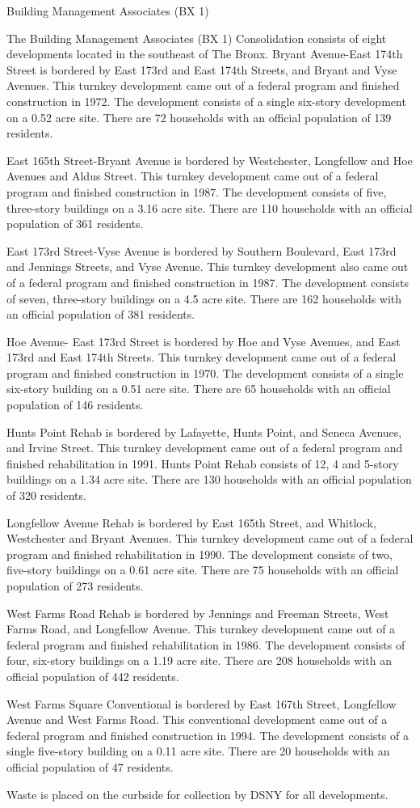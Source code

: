 Building Management Associates (BX 1)

The Building Management Associates (BX 1) Consolidation consists of eight developments located in the southeast of The Bronx. Bryant Avenue-East 174th Street is bordered by East 173rd and East 174th Streets, and Bryant and Vyse Avenues. This turnkey development came out of a federal program and finished construction in 1972. The development consists of a single six-story development on a 0.52 acre site. There are 72 households with an official population of 139 residents.

East 165th Street-Bryant Avenue is bordered by Westchester, Longfellow and Hoe Avenues and Aldus Street. This turnkey development came out of a federal program and finished construction in 1987. The development consists of five, three-story buildings on a 3.16 acre site. There are 110 households with an official population of 361 residents. 

East 173rd Street-Vyse Avenue is bordered by Southern Boulevard, East 173rd and Jennings Streets, and Vyse Avenue. This turnkey development also came out of a federal program and finished construction in 1987. The development consists of seven, three-story buildings on a 4.5 acre site. There are 162 households with an official population of 381 residents.

Hoe Avenue- East 173rd Street is bordered by Hoe and Vyse Avenues, and East 173rd and East 174th Streets. This turnkey development came out of a federal program and finished construction in 1970. The development consists of a single six-story building on a 0.51 acre site. There are 65 households with an official population of 146 residents.

Hunts Point Rehab is bordered by Lafayette, Hunts Point, and Seneca Avenues, and Irvine Street. This turnkey development came out of a federal program and finished rehabilitation in 1991. Hunts Point Rehab consists of 12, 4 and 5-story buildings on a 1.34 acre site. There are 130 households with an official population of 320 residents. 

Longfellow Avenue Rehab is bordered by East 165th Street, and Whitlock, Westchester and Bryant Avenues. This turnkey development came out of a federal program and finished rehabilitation in 1990. The development consists of two, five-story buildings on a 0.61 acre site. There are 75 households with an official population of 273 residents. 

West Farms Road Rehab is bordered by Jennings and Freeman Streets, West Farms Road, and Longfellow Avenue. This turnkey development came out of a federal program and finished rehabilitation in 1986. The development consists of four, six-story buildings on a 1.19 acre site. There are 208 households with an official population of 442 residents.

West Farms Square Conventional is bordered by East 167th Street, Longfellow Avenue and West Farms Road. This conventional development came out of a federal program and finished construction in 1994. The development consists of a single five-story building on a 0.11 acre site. There are 20 households with an official population of 47 residents.

Waste is placed on the curbside for collection by DSNY for all developments.